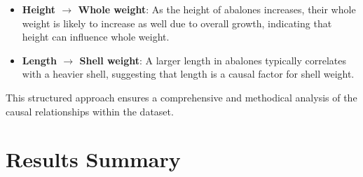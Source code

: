 \documentclass{article}
\begin{document}
\begin{itemize}
    \item \textbf{Height $\rightarrow$ Whole weight}: As the height of abalones increases, their whole weight is likely to increase as well due to overall growth, indicating that height can influence whole weight.

    \item \textbf{Length $\rightarrow$ Shell weight}: A larger length in abalones typically correlates with a heavier shell, suggesting that length is a causal factor for shell weight.
\end{itemize}

This structured approach ensures a comprehensive and methodical analysis of the causal relationships within the dataset.

\section{Results Summary}
\end{document}
